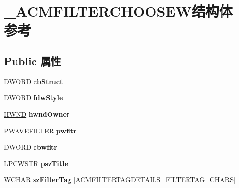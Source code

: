 \hypertarget{struct___a_c_m_f_i_l_t_e_r_c_h_o_o_s_e_w}{}\section{\+\_\+\+A\+C\+M\+F\+I\+L\+T\+E\+R\+C\+H\+O\+O\+S\+E\+W结构体 参考}
\label{struct___a_c_m_f_i_l_t_e_r_c_h_o_o_s_e_w}
\subsection*{Public 属性}
\begin{DoxyCompactItemize}
\item 
\mbox{\label{struct___a_c_m_f_i_l_t_e_r_c_h_o_o_s_e_w_a4f7653a7696989742f80feb0fade71a8}} 
D\+W\+O\+RD {\bfseries cb\+Struct}
\item 
\mbox{\label{struct___a_c_m_f_i_l_t_e_r_c_h_o_o_s_e_w_af77f1ed2fa3359ffddff7c1fde141125}} 
D\+W\+O\+RD {\bfseries fdw\+Style}
\item 
\mbox{\label{struct___a_c_m_f_i_l_t_e_r_c_h_o_o_s_e_w_a83afac8d35f3c199a36e25c491ad9f7f}} 
\hyperlink{interfacevoid}{H\+W\+ND} {\bfseries hwnd\+Owner}
\item 
\mbox{\label{struct___a_c_m_f_i_l_t_e_r_c_h_o_o_s_e_w_a22da03768d4ed28a7556e1ac4cd8011f}} 
\hyperlink{struct___w_a_v_e_f_i_l_t_e_r}{P\+W\+A\+V\+E\+F\+I\+L\+T\+ER} {\bfseries pwfltr}
\item 
\mbox{\label{struct___a_c_m_f_i_l_t_e_r_c_h_o_o_s_e_w_af81bdec0cc23e24eb41e32ef64e3f166}} 
D\+W\+O\+RD {\bfseries cbwfltr}
\item 
\mbox{\label{struct___a_c_m_f_i_l_t_e_r_c_h_o_o_s_e_w_a94a710381d9522891fbbd23b5c1b9f49}} 
L\+P\+C\+W\+S\+TR {\bfseries psz\+Title}
\item 
\mbox{\label{struct___a_c_m_f_i_l_t_e_r_c_h_o_o_s_e_w_a0569a0e6536c6f46c045a3ade68dae74}} 
W\+C\+H\+AR {\bfseries sz\+Filter\+Tag} \mbox{[}A\+C\+M\+F\+I\+L\+T\+E\+R\+T\+A\+G\+D\+E\+T\+A\+I\+L\+S\+\_\+\+F\+I\+L\+T\+E\+R\+T\+A\+G\+\_\+\+C\+H\+A\+RS\mbox{]}

\end{DoxyCompactItemize}
